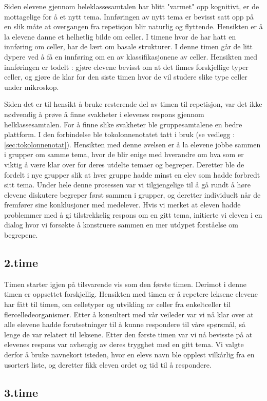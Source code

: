 \documentclass[main.tex]{subfiles}
\begin{document}
Siden elevene gjennom heleklassesamtalen har blitt "varmet" opp kognitivt, er de mottagelige for å 
et nytt tema. Innføringen av nytt tema er bevisst satt opp på en slik måte at overgangen fra 
repetisjon blir naturlig og flyttende. Hensikten er å la elevene danne et helhetlig bilde om
celler. I timene hvor de har hatt en innføring om celler, har de lært om basale strukturer.
I denne timen går de litt dypere ved å få en innføring om en av klassifikasjonene av celler.
Hensikten med innføringen er todelt : gjøre elevene bevisst om at det finnes forskjellige typer
celler, og gjøre de klar for den siste timen hvor de vil studere slike type celler under mikroskop.

Siden det er til hensikt å bruke resterende del av timen til repetisjon, var det ikke nødvendig å 
prøve å finne svakheter i elevenes respons gjennom helklassesamtalen. For å finne slike svakheter 
ble gruppesamtalene en bedre plattform. I den forbindelse ble tokolonnenotatet tatt i bruk (se 
vedlegg : \ref{sec:tokolonnenotat}). Hensikten med denne øvelsen er å la elevene jobbe sammen
i grupper om samme tema, hvor de blir enige med hverandre om hva som er viktig å være klar over
for deres utdelte temaer og begreper. Deretter ble de fordelt i nye grupper slik at hver 
gruppe hadde minst en elev som hadde forbredt sitt tema. Under hele denne prosessen var vi
tilgjengelige til å gå rundt å høre elevene diskutere begreper først sammen i grupper, og deretter
individuelt når de fremfører sine konklusjoner med medelever. Hvis vi merket at eleven hadde
problemmer med å gi tilstrekkelig respons om en gitt tema, initierte vi eleven i en dialog hvor
vi forsøkte å konstruere sammen en mer utdypet forståelse om begrepene. 

\subsection*{2.time}

Timen starter igjen på tilsvarende vis som den første timen. Derimot i denne timen er oppsettet 
forskjellig. Hensikten med timen er å repetere leksene elevene har fått til timen, om celletyper og
utvikling av celler fra enkeltceller til flercelledeorganismer. Etter å konsultert med vår veileder 
var vi nå klar over at alle elevene hadde forutsetninger til å kunne respondere til våre spørsmål, 
så lenge de var relatert til leksene. Etter den første timen var vi nå bevisste på at elevenes 
respons var avhengig av deres trygghet med en gitt tema. Vi valgte derfor å bruke navnekort 
isteden, hvor en elevs navn ble opplest vilkårlig fra en usortert liste, og deretter fikk eleven 
ordet og tid til å respondere.

\subsection*{3.time}
\end{document}
